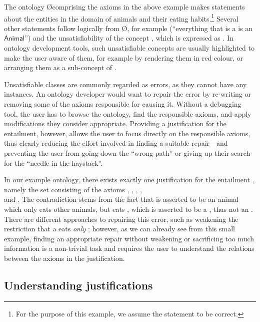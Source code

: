 The ontology \O comprising the axioms in the above example makes statements about the entities in the domain of animals and their eating habits.\footnote{For the purpose of this example, we assume the statement  to be correct.} Several other statements follow logically from \O, for example  (\enquote{everything that is a  is an $\mathsf{Animal}$}) and the unsatisfiability of the concept , which is expressed as . In ontology development tools, such unsatisfiable concepts are usually highlighted to make the user aware of them, for example by rendering them in red colour, or arranging them as a sub-concept of . 

Unsatisfiable classes are commonly regarded as errors, as they cannot have any instances. An ontology developer would want to repair the error by re-writing or removing some of the axioms responsible for causing it. Without a debugging tool, the user has to browse the ontology, find the responsible axioms, and apply modifications they consider appropriate. Providing a justification for the entailment, however, allows the user to focus directly on the responsible axioms, thus clearly reducing the effort involved in finding a suitable repair---and preventing the user from going down the \enquote{wrong path} or giving up their search for the \enquote{needle in the haystack}. 

In our example ontology, there exists exactly one justification for the entailment , namely the set consisting of the axioms , ,  , , \\and {}. The contradiction stems from the fact that  is asserted to be an animal which only eats other animals, but  eats , which is asserted to be a , thus not an . There are different approaches to repairing this error, such as weakening the restriction that a  eats \emph{only} ; however, as we can already see from this small example, finding an appropriate repair without weakening or sacrificing too much information is a non-trivial task and requires the user to understand the relations between the axioms in the justification.

\subsection{Understanding justifications}

